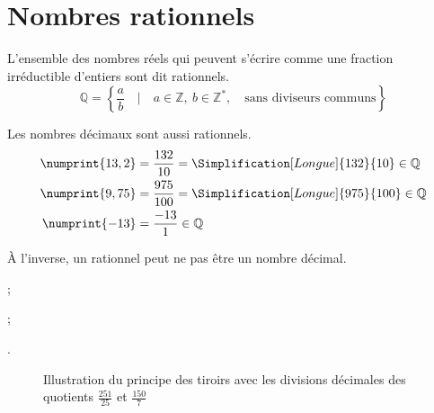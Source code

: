 \section{Nombres rationnels}
\begin{definition}
	L'ensemble des nombres réels qui peuvent s'écrire comme une fraction irréductible d'entiers sont dit rationnels.  
	\[  \mathbb{Q}=\left\{\dfrac{a}{b} \quad \big| \quad a\in\mathbb{Z},~b\in\mathbb{Z}^* , \quad\text{sans diviseurs communs}\right\}
	\]
\end{definition}
\begin{remark}
	Les nombres décimaux sont aussi rationnels.
	\begin{align*}
		\numprint{13,2}&=\frac{132}{10}=\Simplification[Longue]{132}{10}\in\mathbb{Q} \\	\numprint{9,75}&=\frac{975}{100}=\Simplification[Longue]{975}{100}\in\mathbb{Q}\\
		\numprint{-13}& = \frac{-13}{1}\in\mathbb{Q} 
	\end{align*}  
\end{remark} 
À l'inverse, un rationnel peut ne pas être un nombre décimal.
\begin{example} \hfill 
	
 ; 

;

.

\begin{figure}[ht] 
\caption{Illustration du principe des tiroirs avec les divisions décimales des quotients $\frac{251}{25}$ et $\frac{150}{7}$}
\end{figure}
\end{example} 

